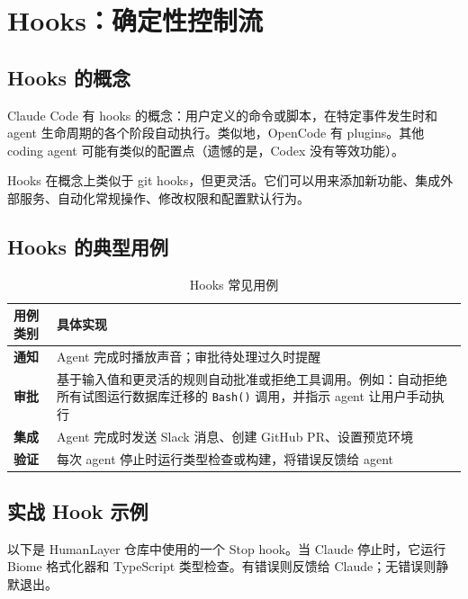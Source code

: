 \section{Hooks：确定性控制流}

\subsection{Hooks 的概念}

Claude Code 有 hooks 的概念：用户定义的命令或脚本，在特定事件发生时和 agent 生命周期的各个阶段自动执行。类似地，OpenCode 有 plugins。其他 coding agent 可能有类似的配置点（遗憾的是，Codex 没有等效功能）。

Hooks 在概念上类似于 git hooks，但更灵活。它们可以用来添加新功能、集成外部服务、自动化常规操作、修改权限和配置默认行为。

\subsection{Hooks 的典型用例}

\begin{table}[H]
\centering
\caption{Hooks 常见用例}
\begin{tabular}{@{}p{3cm}p{10cm}@{}}
\toprule
\textbf{用例类别} & \textbf{具体实现} \\
\midrule
\textbf{通知} & Agent 完成时播放声音；审批待处理过久时提醒 \\
\textbf{审批} & 基于输入值和更灵活的规则自动批准或拒绝工具调用。例如：自动拒绝所有试图运行数据库迁移的 \texttt{Bash()} 调用，并指示 agent 让用户手动执行 \\
\textbf{集成} & Agent 完成时发送 Slack 消息、创建 GitHub PR、设置预览环境 \\
\textbf{验证} & 每次 agent 停止时运行类型检查或构建，将错误反馈给 agent \\
\bottomrule
\end{tabular}
\end{table}

\subsection{实战 Hook 示例}

以下是 HumanLayer 仓库中使用的一个 Stop hook。当 Claude 停止时，它运行 Biome 格式化器和 TypeScript 类型检查。有错误则反馈给 Claude；无错误则静默退出。

